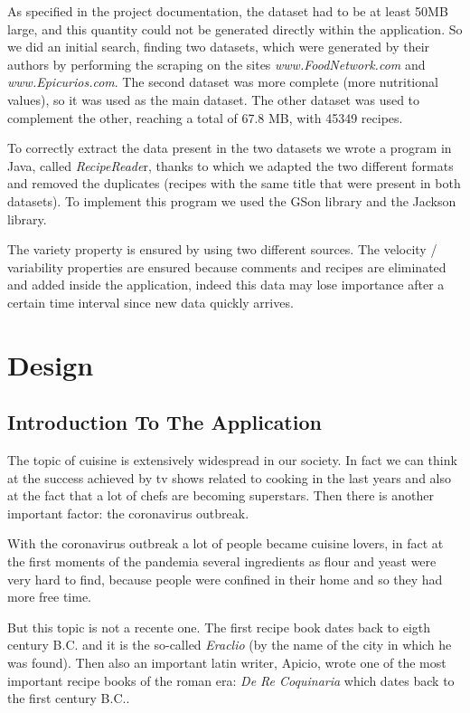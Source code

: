 \documentclass[a4paper]{report}
\begin{document}
\noindent As specified in the project documentation, the dataset had to be at least 50MB large, and this quantity could not be generated directly within the application. So we did an initial search, finding two datasets, which were generated by their authors by performing the scraping on the sites \emph{www.FoodNetwork.com} and \emph{www.Epicurios.com}. The second dataset was more complete (more nutritional values), so it was used as the main dataset. The other dataset was used to complement the other, reaching a total of  67.8 MB, with 45349 recipes.

\noindent To correctly extract the data present in the two datasets we wrote a program in Java, called \emph{RecipeReade}r, thanks to which we adapted the two different formats and removed the duplicates (recipes with the same title that were present in both datasets).
To implement this program we used the GSon library and the Jackson library.

\noindent The variety property is ensured by using two different sources. The velocity / variability properties are ensured because comments and recipes are eliminated and added inside the application, indeed this data may lose importance after a certain time interval since new data quickly arrives.

\chapter{Design}
\section{Introduction To The Application}
The topic of cuisine is extensively widespread in our society. In fact we can think at the success achieved by tv shows related to cooking in the last years and also at the fact that a lot of chefs are becoming superstars.
Then there is another important factor: the coronavirus outbreak.

\noindent With the coronavirus outbreak a lot of people became cuisine lovers, in fact at the first moments of the pandemia several ingredients as flour and yeast were very hard to find, because people were confined in their home and so they had more free time.

\noindent But this topic is not a recente one. The first recipe book dates back to eigth century B.C. and it is the so-called \emph{Eraclio} (by the name of the city in which he was found). Then also an important latin writer, Apicio, wrote one of the most important recipe books of the roman era: \emph{De Re Coquinaria} which dates back to the first century B.C..
 
\end{document}
